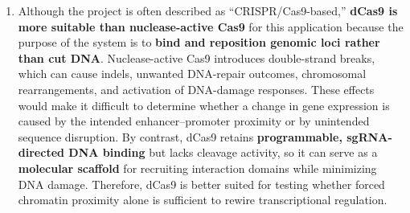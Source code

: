 \documentclass[12pt,a4paper]{article}
\begin{document}
\begin{enumerate}[parsep=0.5\baselineskip]
  \item Although the project is often described as ``CRISPR/Cas9-based,'' \textbf{dCas9 is more suitable than nuclease-active Cas9} for this application because the purpose of the system is to \textbf{bind and reposition genomic loci rather than cut DNA}. Nuclease-active Cas9 introduces double-strand breaks, which can cause indels, unwanted DNA-repair outcomes, chromosomal rearrangements, and activation of DNA-damage responses. These effects would make it difficult to determine whether a change in gene expression is caused by the intended enhancer--promoter proximity or by unintended sequence disruption. By contrast, dCas9 retains \textbf{programmable, sgRNA-directed DNA binding} but lacks cleavage activity, so it can serve as a \textbf{molecular scaffold} for recruiting interaction domains while minimizing DNA damage. Therefore, dCas9 is better suited for testing whether forced chromatin proximity alone is sufficient to rewire transcriptional regulation.
\end{enumerate}
\end{document}
